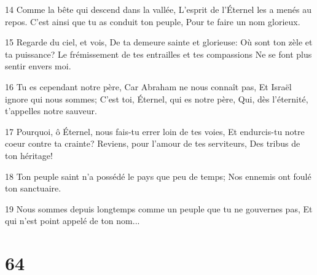 \par 14 Comme la bête qui descend dans la vallée, L'esprit de l'Éternel les a menés au repos. C'est ainsi que tu as conduit ton peuple, Pour te faire un nom glorieux.
\par 15 Regarde du ciel, et vois, De ta demeure sainte et glorieuse: Où sont ton zèle et ta puissance? Le frémissement de tes entrailles et tes compassions Ne se font plus sentir envers moi.
\par 16 Tu es cependant notre père, Car Abraham ne nous connaît pas, Et Israël ignore qui nous sommes; C'est toi, Éternel, qui es notre père, Qui, dès l'éternité, t'appelles notre sauveur.
\par 17 Pourquoi, ô Éternel, nous fais-tu errer loin de tes voies, Et endurcis-tu notre coeur contre ta crainte? Reviens, pour l'amour de tes serviteurs, Des tribus de ton héritage!
\par 18 Ton peuple saint n'a possédé le pays que peu de temps; Nos ennemis ont foulé ton sanctuaire.
\par 19 Nous sommes depuis longtemps comme un peuple que tu ne gouvernes pas, Et qui n'est point appelé de ton nom...

\chapter{64}


